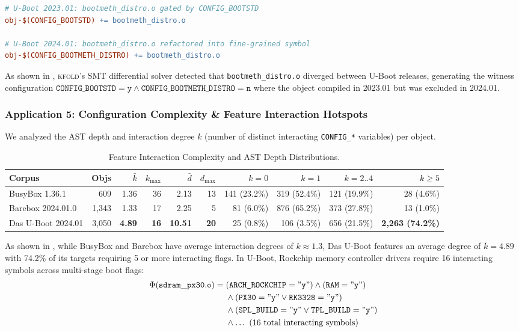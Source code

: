 \documentclass[acmsmall,screen,review]{acmart}
\newcommand{\tool}{\textsc{kfold}\xspace}
\begin{document}
\begin{lstlisting}[language=make,caption={Evolution of Bootflow Targets in Das U-Boot 2023.01 $\to$ 2024.01.},label={lst:uboot-diff}]
# U-Boot 2023.01: bootmeth_distro.o gated by CONFIG_BOOTSTD
obj-$(CONFIG_BOOTSTD) += bootmeth_distro.o

# U-Boot 2024.01: bootmeth_distro.o refactored into fine-grained symbol
obj-$(CONFIG_BOOTMETH_DISTRO) += bootmeth_distro.o
\end{lstlisting}

As shown in , \tool's SMT differential solver detected that \texttt{bootmeth\_distro.o} diverged between U-Boot releases, generating the witness configuration $\texttt{CONFIG\_BOOTSTD}=\mathtt{y} \wedge \texttt{CONFIG\_BOOTMETH\_DISTRO}=\mathtt{n}$ where the object compiled in 2023.01 but was excluded in 2024.01.

\subsubsection{Application 5: Configuration Complexity \& Feature Interaction Hotspots}
We analyzed the AST depth and interaction degree $k$ (number of distinct interacting \texttt{CONFIG\_*} variables) per object.

\begin{table}[t]
\centering
\footnotesize
\setlength{\tabcolsep}{3pt}
\caption{Feature Interaction Complexity and AST Depth Distributions.}
\label{tab:interactions}
\begin{tabular}{lrrrrrrrrr}
\toprule
\textbf{Corpus} & \textbf{Objs} & $\bar{k}$ & $k_{\max}$ & $\bar{d}$ & $d_{\max}$ & $k=0$ & $k=1$ & $k=2..4$ & $k \ge 5$ \\
\midrule
BusyBox 1.36.1 & 609 & 1.36 & 36 & 2.13 & 13 & 141 (23.2\%) & 319 (52.4\%) & 121 (19.9\%) & 28 (4.6\%) \\
Barebox 2024.01.0 & 1,343 & 1.33 & 17 & 2.25 & 5 & 81 (6.0\%) & 876 (65.2\%) & 373 (27.8\%) & 13 (1.0\%) \\
Das U-Boot 2024.01 & 3,050 & \textbf{4.89} & \textbf{16} & \textbf{10.51} & \textbf{20} & 25 (0.8\%) & 106 (3.5\%) & 656 (21.5\%) & \textbf{2,263 (74.2\%)} \\
\bottomrule
\end{tabular}
\end{table}

As shown in , while BusyBox and Barebox have average interaction degrees of $k \approx 1.3$, Das U-Boot features an average degree of $\bar{k}=4.89$ with 74.2\% of its targets requiring 5 or more interacting flags. In U-Boot, Rockchip memory controller drivers require 16 interacting symbols across multi-stage boot flags:
\begin{align*}
\Phi(\mathtt{sdram\_px30.o}) = \; &(\texttt{ARCH\_ROCKCHIP} = \mathtt{"y"}) \wedge (\texttt{RAM} = \mathtt{"y"}) \\
&\wedge (\texttt{PX30} = \mathtt{"y"} \vee \texttt{RK3328} = \mathtt{"y"}) \\
&\wedge (\texttt{SPL\_BUILD} = \mathtt{"y"} \vee \texttt{TPL\_BUILD} = \mathtt{"y"}) \\
&\wedge \dots \text{ (16 total interacting symbols)}
\end{align*}
\end{document}
